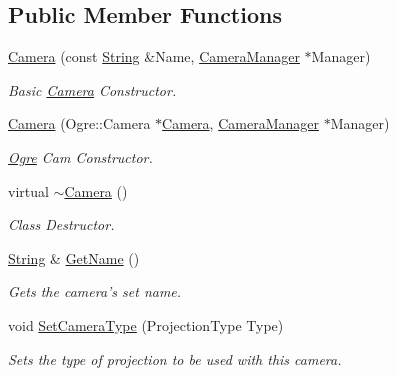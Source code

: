 \subsection*{Public Member Functions}
\begin{DoxyCompactItemize}
\item 
\hyperlink{classphys_1_1Camera_a863e7b7a0fb4db7969014d8391b5ca30}{Camera} (const \hyperlink{namespacephys_aa03900411993de7fbfec4789bc1d392e}{String} \&Name, \hyperlink{classphys_1_1CameraManager}{CameraManager} $\ast$Manager)
\begin{DoxyCompactList}\small\item\em Basic \hyperlink{classphys_1_1Camera}{Camera} Constructor. \item\end{DoxyCompactList}\item 
\hyperlink{classphys_1_1Camera_a0510d4f9bf6fb195115272cbd116e8dd}{Camera} (Ogre::Camera $\ast$\hyperlink{classphys_1_1Camera}{Camera}, \hyperlink{classphys_1_1CameraManager}{CameraManager} $\ast$Manager)
\begin{DoxyCompactList}\small\item\em \hyperlink{namespaceOgre}{Ogre} Cam Constructor. \item\end{DoxyCompactList}\item 
virtual \hyperlink{classphys_1_1Camera_aa45f340a6f7ba0970aa2602a928463ea}{$\sim$Camera} ()
\begin{DoxyCompactList}\small\item\em Class Destructor. \item\end{DoxyCompactList}\item 
\hyperlink{namespacephys_aa03900411993de7fbfec4789bc1d392e}{String} \& \hyperlink{classphys_1_1Camera_aee08e3932237c76d2b59652878f2bdf6}{GetName} ()
\begin{DoxyCompactList}\small\item\em Gets the camera's set name. \item\end{DoxyCompactList}\item 
void \hyperlink{classphys_1_1Camera_ac3a8ffec5fa70fa4981fc25815fdc8a3}{SetCameraType} (ProjectionType Type)
\begin{DoxyCompactList}\small\item\em Sets the type of projection to be used with this camera. \item\end{DoxyCompactList}\item 

\end{DoxyCompactItemize}
